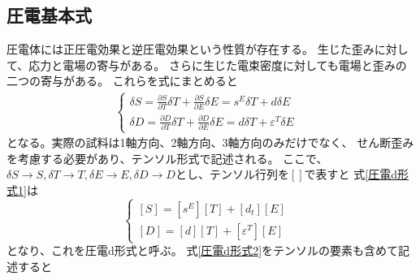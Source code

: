 \documentclass[dvipdfmx,12pt,a4paper]{jreport}
\begin{document}
		\subsection{圧電基本式}
		圧電体には正圧電効果と逆圧電効果という性質が存在する。
		生じた歪みに対して、応力と電場の寄与がある。
		さらに生じた電束密度に対しても電場と歪みの二つの寄与がある。
		これらを式にまとめると
				\begin{eqnarray}
					\begin{cases}
						\delta S=\frac{\partial S}{\partial T}\delta T + \frac{\partial S}{\partial E} \delta E 
						= s^{E}\delta T+d \delta E & \\
						\delta D=\frac{\partial D}{\partial T}\delta T + \frac{\partial D}{\partial E}\delta E 
						= d \delta T+\varepsilon^T \delta E  &
					\end{cases}
					\label{圧電d形式1}
				\end{eqnarray}
			となる。実際の試料は1軸方向、2軸方向、3軸方向のみだけでなく、
			せん断歪みを考慮する必要があり、テンソル形式で記述される。
			ここで、$\delta S\rightarrow S, \delta T\rightarrow T,
			\delta E\rightarrow E, \delta D\rightarrow D$とし、テンソル行列を$\left[　\right]$で表すと
			式\ref{圧電d形式1}は
			\begin{equation}
				\begin{cases}
					\left[S\right]=\left[s^E\right]\left[T\right]+\left[d_t\right]\left[E\right]& \\
					\left[D\right]=\left[d\right]\left[T\right]+\left[\varepsilon^T\right]\left[E\right]
				\end{cases}
				\label{圧電d形式2}
			\end{equation}
			となり、これを圧電d形式と呼ぶ。
			式\ref{圧電d形式2}をテンソルの要素も含めて記述すると
\end{document}
